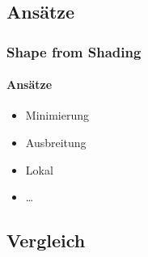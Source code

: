 \documentclass{beamer}
\begin{document}
\subsection{Ansätze}
\begin{frame}
	\frametitle{Shape from Shading}
	\framesubtitle{Ansätze}
	
	\begin{itemize}
		\item Minimierung
		\item Ausbreitung
		\item Lokal
		\item \dots
	\end{itemize}
\end{frame}

\subsection{Vergleich}
\end{document}
